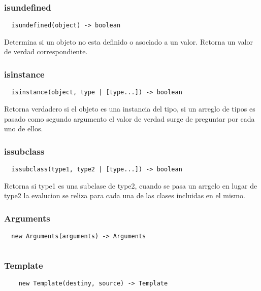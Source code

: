 \subsubsection*{isundefined}
\begin{verbatim}
  isundefined(object) -> boolean
\end{verbatim}
Determina si un objeto no esta definido o asociado a un valor. Retorna un valor
de verdad correspondiente.

\subsubsection*{isinstance}
\begin{verbatim}
  isinstance(object, type | [type...]) -> boolean
\end{verbatim}
Retorna verdadero si el objeto es una instancia del tipo, si un arreglo de tipos
es pasado como segundo argumento el valor de verdad surge de preguntar por cada
uno de ellos.

\subsubsection*{issubclass}
\begin{verbatim}
  issubclass(type1, type2 | [type...]) -> boolean
\end{verbatim}
Retorna si type1 es una subclase de type2, cuando se pasa un arrgelo en lugar de
type2 la evalucion se reliza para cada una de las clases incluidas en el mismo.

\subsubsection*{Arguments}
\begin{verbatim}
  new Arguments(arguments) -> Arguments
\end{verbatim}

\begin{lstlisting}[style=consola]
\end{lstlisting}

\subsubsection*{Template}
\begin{verbatim}
    new Template(destiny, source) -> Template
\end{verbatim}

